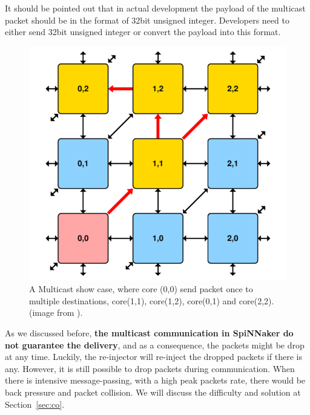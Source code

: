 It should be pointed out that in actual development the payload of the multicast packet should be in the format of 32bit unsigned integer. Developers need to either send 32bit unsigned integer or convert the payload into this format.\\

\begin{figure}[tb]
\centering
\includegraphics[width = 0.7\hsize]{figures/multicast.png}
\caption{A Multicast show case, where core (0,0) send packet once to multiple destinations, core(1,1), core(1,2), core(0,1) and core(2,2).(image from \cite{ws6}).}
\label{fig:multicast}
\end{figure}

As we discussed before, \textbf{the multicast communication in SpiNNaker do not guarantee the delivery}, and as a consequence, the packets might be drop at any time. Luckily, the re-injector will re-inject the dropped packets if there is any. However, it is still possible to drop packets during communication. When there is intensive message-passing, with a high peak packets rate, there would be back pressure and packet collision. We will discuss the difficulty and solution at Section~\ref{sec:co}.\\


